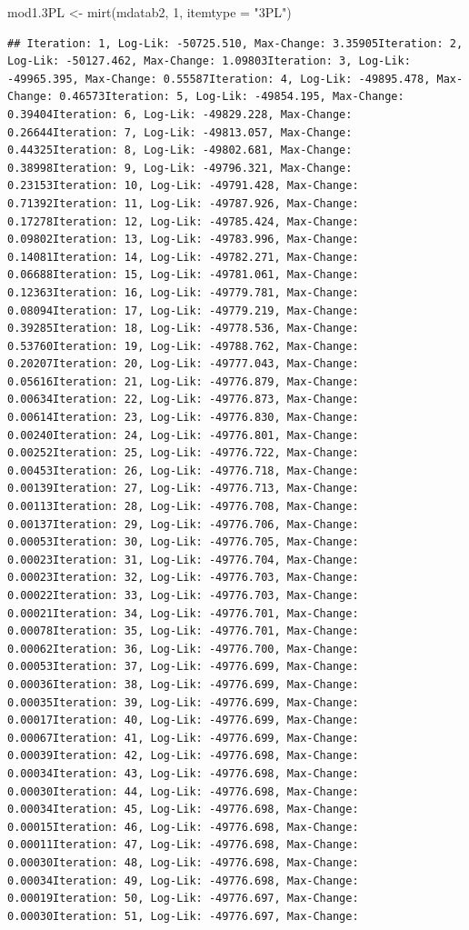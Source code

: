 \documentclass[
]{book}
\newenvironment{Shaded}{\begin{snugshade}}{\end{snugshade}}
\newcommand{\AttributeTok}[1]{\textcolor[rgb]{0.77,0.63,0.00}{#1}}
\newcommand{\DecValTok}[1]{\textcolor[rgb]{0.00,0.00,0.81}{#1}}
\newcommand{\FloatTok}[1]{\textcolor[rgb]{0.00,0.00,0.81}{#1}}
\newcommand{\FunctionTok}[1]{\textcolor[rgb]{0.00,0.00,0.00}{#1}}
\newcommand{\NormalTok}[1]{#1}
\newcommand{\OtherTok}[1]{\textcolor[rgb]{0.56,0.35,0.01}{#1}}
\newcommand{\StringTok}[1]{\textcolor[rgb]{0.31,0.60,0.02}{#1}}
\begin{document}
\begin{Shaded}
\begin{Highlighting}[]
\NormalTok{mod1}\FloatTok{.3}\NormalTok{PL }\OtherTok{\textless{}{-}} \FunctionTok{mirt}\NormalTok{(mdatab2, }\DecValTok{1}\NormalTok{, }\AttributeTok{itemtype =} \StringTok{"3PL"}\NormalTok{)}
\end{Highlighting}
\end{Shaded}

\begin{verbatim}
## Iteration: 1, Log-Lik: -50725.510, Max-Change: 3.35905Iteration: 2, Log-Lik: -50127.462, Max-Change: 1.09803Iteration: 3, Log-Lik: -49965.395, Max-Change: 0.55587Iteration: 4, Log-Lik: -49895.478, Max-Change: 0.46573Iteration: 5, Log-Lik: -49854.195, Max-Change: 0.39404Iteration: 6, Log-Lik: -49829.228, Max-Change: 0.26644Iteration: 7, Log-Lik: -49813.057, Max-Change: 0.44325Iteration: 8, Log-Lik: -49802.681, Max-Change: 0.38998Iteration: 9, Log-Lik: -49796.321, Max-Change: 0.23153Iteration: 10, Log-Lik: -49791.428, Max-Change: 0.71392Iteration: 11, Log-Lik: -49787.926, Max-Change: 0.17278Iteration: 12, Log-Lik: -49785.424, Max-Change: 0.09802Iteration: 13, Log-Lik: -49783.996, Max-Change: 0.14081Iteration: 14, Log-Lik: -49782.271, Max-Change: 0.06688Iteration: 15, Log-Lik: -49781.061, Max-Change: 0.12363Iteration: 16, Log-Lik: -49779.781, Max-Change: 0.08094Iteration: 17, Log-Lik: -49779.219, Max-Change: 0.39285Iteration: 18, Log-Lik: -49778.536, Max-Change: 0.53760Iteration: 19, Log-Lik: -49788.762, Max-Change: 0.20207Iteration: 20, Log-Lik: -49777.043, Max-Change: 0.05616Iteration: 21, Log-Lik: -49776.879, Max-Change: 0.00634Iteration: 22, Log-Lik: -49776.873, Max-Change: 0.00614Iteration: 23, Log-Lik: -49776.830, Max-Change: 0.00240Iteration: 24, Log-Lik: -49776.801, Max-Change: 0.00252Iteration: 25, Log-Lik: -49776.722, Max-Change: 0.00453Iteration: 26, Log-Lik: -49776.718, Max-Change: 0.00139Iteration: 27, Log-Lik: -49776.713, Max-Change: 0.00113Iteration: 28, Log-Lik: -49776.708, Max-Change: 0.00137Iteration: 29, Log-Lik: -49776.706, Max-Change: 0.00053Iteration: 30, Log-Lik: -49776.705, Max-Change: 0.00023Iteration: 31, Log-Lik: -49776.704, Max-Change: 0.00023Iteration: 32, Log-Lik: -49776.703, Max-Change: 0.00022Iteration: 33, Log-Lik: -49776.703, Max-Change: 0.00021Iteration: 34, Log-Lik: -49776.701, Max-Change: 0.00078Iteration: 35, Log-Lik: -49776.701, Max-Change: 0.00062Iteration: 36, Log-Lik: -49776.700, Max-Change: 0.00053Iteration: 37, Log-Lik: -49776.699, Max-Change: 0.00036Iteration: 38, Log-Lik: -49776.699, Max-Change: 0.00035Iteration: 39, Log-Lik: -49776.699, Max-Change: 0.00017Iteration: 40, Log-Lik: -49776.699, Max-Change: 0.00067Iteration: 41, Log-Lik: -49776.699, Max-Change: 0.00039Iteration: 42, Log-Lik: -49776.698, Max-Change: 0.00034Iteration: 43, Log-Lik: -49776.698, Max-Change: 0.00030Iteration: 44, Log-Lik: -49776.698, Max-Change: 0.00034Iteration: 45, Log-Lik: -49776.698, Max-Change: 0.00015Iteration: 46, Log-Lik: -49776.698, Max-Change: 0.00011Iteration: 47, Log-Lik: -49776.698, Max-Change: 0.00030Iteration: 48, Log-Lik: -49776.698, Max-Change: 0.00034Iteration: 49, Log-Lik: -49776.698, Max-Change: 0.00019Iteration: 50, Log-Lik: -49776.697, Max-Change: 0.00030Iteration: 51, Log-Lik: -49776.697, Max-Change: 
\end{verbatim}
\end{document}
